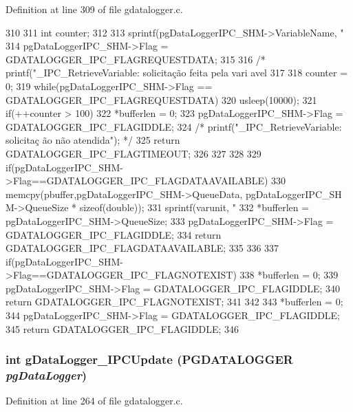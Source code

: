 Definition at line 309 of file gdatalogger.c.


\begin{DoxyCode}
310 {
311         int counter;
312         
313         sprintf(pgDataLoggerIPC_SHM->VariableName, "%
314         pgDataLoggerIPC_SHM->Flag = GDATALOGGER_IPC_FLAGREQUESTDATA;
315         
316 /*      printf("\ngDataLogger_IPC_RetrieveVariable: solicitação feita pela vari
      avel %
317 
318         counter = 0;
319         while(pgDataLoggerIPC_SHM->Flag == GDATALOGGER_IPC_FLAGREQUESTDATA){
320                 usleep(10000);
321                 if(++counter > 100){
322                         *bufferlen = 0;
323                         pgDataLoggerIPC_SHM->Flag = GDATALOGGER_IPC_FLAGIDDLE;
324                         /* printf("\ngDataLogger_IPC_RetrieveVariable: solicitaç
      ão não atendida"); */
325                         return GDATALOGGER_IPC_FLAGTIMEOUT;
326                 }
327         }
328         
329         if(pgDataLoggerIPC_SHM->Flag==GDATALOGGER_IPC_FLAGDATAAVAILABLE){
330                 memcpy(pbuffer,pgDataLoggerIPC_SHM->QueueData, pgDataLoggerIPC_SH
      M->QueueSize * sizeof(double));
331                 sprintf(varunit, "%
332                 *bufferlen = pgDataLoggerIPC_SHM->QueueSize;
333                 pgDataLoggerIPC_SHM->Flag = GDATALOGGER_IPC_FLAGIDDLE;
334                 return GDATALOGGER_IPC_FLAGDATAAVAILABLE;
335         }
336 
337         if(pgDataLoggerIPC_SHM->Flag==GDATALOGGER_IPC_FLAGNOTEXIST){
338                 *bufferlen = 0;
339                 pgDataLoggerIPC_SHM->Flag = GDATALOGGER_IPC_FLAGIDDLE;
340                 return GDATALOGGER_IPC_FLAGNOTEXIST;
341         }
342         
343         *bufferlen = 0;
344         pgDataLoggerIPC_SHM->Flag = GDATALOGGER_IPC_FLAGIDDLE;
345         return GDATALOGGER_IPC_FLAGIDDLE;
346 }
\end{DoxyCode}
\subsubsection[{gDataLogger\_\-IPCUpdate}]{\setlength{\rightskip}{0pt plus 5cm}int gDataLogger\_\-IPCUpdate ({\bf PGDATALOGGER} {\em pgDataLogger})}\label{gdatalogger_8c_afa42a993493cf98d32da11e4279816f7}


Definition at line 264 of file gdatalogger.c.


